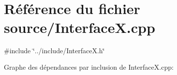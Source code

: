 \hypertarget{a00042}{
\section{Référence du fichier source/InterfaceX.cpp}
\label{a00042}
}
{\ttfamily \#include \char`\"{}../include/InterfaceX.h\char`\"{}}\par
Graphe des dépendances par inclusion de InterfaceX.cpp:
